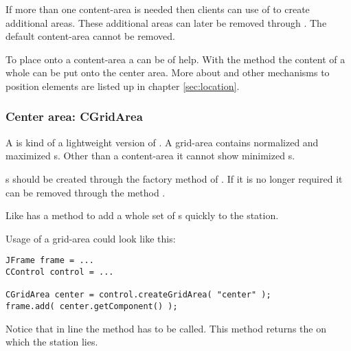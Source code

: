 If more than one content-area is needed then clients can use \linebreak {} of  to create additional areas. These additional areas can later be removed through . The default content-area cannot be removed.



To place  onto a content-area a  can be of help. With the method  the content of a whole  can be put onto the center area. More about  and other mechanisms to position elements are listed up in chapter \ref{sec:location}.

\subsubsection{Center area: CGridArea}
A  is kind of a lightweight version of . A grid-area contains normalized and maximized s. Other than a content-area it cannot show minimized s.

s should be created through the factory method  of . If it is no longer required it can be removed through the method .

Like   has a method  to add a whole set of s quickly to the station.

Usage of a grid-area could look like this:

\begin{lstlisting}
JFrame frame = ...
CControl control = ...

CGridArea center = control.createGridArea( "center" );
frame.add( center.getComponent() );
\end{lstlisting}
Notice that in line  the method  has to be called. This method returns the  on which the station lies.


